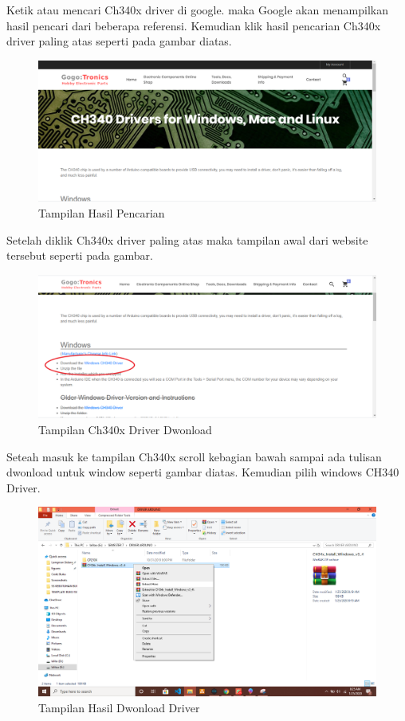 \par Ketik atau mencari Ch340x driver di google.  maka Google akan menampilkan hasil pencari dari beberapa referensi. Kemudian klik hasil pencarian Ch340x driver paling atas seperti pada gambar diatas.
\begin{figure}[H]
\centering
\includegraphics[width=1\textwidth]{figures/google9.png}
\caption{Tampilan Hasil Pencarian }
\label{print}
\end{figure}
\par Setelah diklik Ch340x driver paling atas maka tampilan awal dari website tersebut seperti pada gambar.
\begin{figure}[H]
\centering
\includegraphics[width=1\textwidth]{figures/google10.png}
\caption{Tampilan Ch340x Driver Dwonload }
\label{print}
\end{figure}
\par Seteah masuk ke tampilan Ch340x scroll kebagian bawah sampai ada tulisan dwonload untuk window seperti gambar diatas. Kemudian pilih windows CH340 Driver.
\begin{figure}[H]
\centering
\includegraphics[width=1\textwidth]{figures/google11.png}
\caption{Tampilan Hasil Dwonload Driver }
\label{print}
\end{figure}
